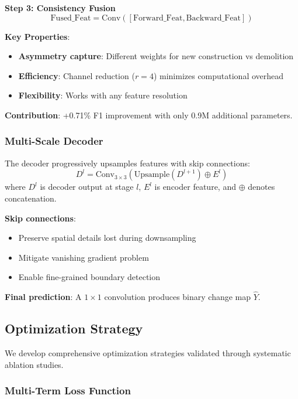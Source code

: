 \documentclass[journal]{IEEEtran}
\begin{document}
\textbf{Step 3: Consistency Fusion}
\begin{equation}
\text{Fused\_Feat} = \text{Conv}([\text{Forward\_Feat}, \text{Backward\_Feat}])
\end{equation}

\textbf{Key Properties}:
\begin{itemize}
    \item \textbf{Asymmetry capture}: Different weights for new construction vs demolition
    \item \textbf{Efficiency}: Channel reduction ($r=4$) minimizes computational overhead
    \item \textbf{Flexibility}: Works with any feature resolution
\end{itemize}

\textbf{Contribution}: +0.71\% F1 improvement with only 0.9M additional parameters.

\subsubsection{Multi-Scale Decoder}

The decoder progressively upsamples features with skip connections:
\begin{equation}
D^l = \text{Conv}_{3 \times 3}(\text{Upsample}(D^{l+1}) \oplus E^l)
\end{equation}
where $D^l$ is decoder output at stage $l$, $E^l$ is encoder feature, and $\oplus$ denotes concatenation.

\textbf{Skip connections}:
\begin{itemize}
    \item Preserve spatial details lost during downsampling
    \item Mitigate vanishing gradient problem
    \item Enable fine-grained boundary detection
\end{itemize}

\textbf{Final prediction}: A $1 \times 1$ convolution produces binary change map $\hat{Y}$.

\subsection{Optimization Strategy}

We develop comprehensive optimization strategies validated through systematic ablation studies.

\subsubsection{Multi-Term Loss Function}
\end{document}
